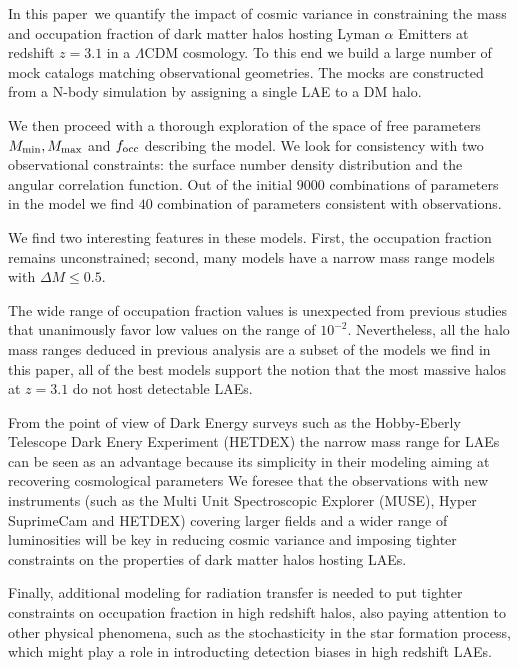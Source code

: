 \documentclass{emulateapj}
\newcommand{\documentname}{paper~}
\newcommand{\ly}{{\ifmmode{{\rm Ly}\alpha}\else{Ly$\alpha$~}\fi}}
\begin{document}
In this \documentname we quantify the impact of cosmic variance in
constraining the  mass and occupation fraction of dark matter halos
hosting Lyman $\alpha$ Emitters at redshift $z=3.1$ in a $\Lambda$CDM
cosmology.  To this end we build a large number of mock catalogs
matching observational geometries. The mocks are constructed from a
N-body simulation by assigning a single LAE to a DM halo.
 
We then proceed with a thorough exploration of the space of free
parameters $M_{\rm min}, M_{\rm max}$ and $f_{\rm occ}$ describing the
model. We look for consistency with two observational constraints: the
surface number density distribution and the angular correlation
function. Out of the initial $9000$  combinations of parameters in the
model we find $40$ combination of parameters consistent with
observations. 

We find two interesting features in these models. First, the
occupation fraction remains unconstrained; second, many models have a
narrow mass range models with $\Delta M \leq 0.5$.  

The wide range of occupation fraction values is unexpected from
previous studies \citep[i.e.][]{Gawiser2007,Ouchi2010}  that
unanimously favor low values on the range of $10^{-2}$. Nevertheless,
all the halo mass ranges deduced in previous analysis are a subset of
the models we find in this paper, all of the best models support the
notion that the most massive halos at $z=3.1$ do not host detectable
LAEs.   

  From the point of view of Dark Energy surveys such as the Hobby-Eberly
  Telescope Dark Enery Experiment (HETDEX) the
  narrow mass range for LAEs can be seen as an advantage because its
  simplicity in their modeling aiming at recovering cosmological
  parameters We foresee that the observations with new instruments
(such as the Multi Unit Spectroscopic Explorer (MUSE), Hyper
SuprimeCam and HETDEX) covering larger fields and a wider range of
luminosities will be key in reducing cosmic variance and imposing
tighter constraints on the properties of dark matter halos hosting
LAEs. 

Finally, additional modeling for \ly radiation transfer is needed to
put tighter constraints on  occupation fraction in high redshift
halos, also paying attention to other physical phenomena, such as the
stochasticity \citep{ForeroRomero2013} in the star formation process,
which might play a role in introducting detection biases in high redshift
LAEs.
\end{document}
